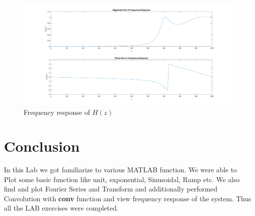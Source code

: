 \documentclass{article}
\begin{document}


\begin{figure}[H]

    \centering
    \includegraphics[scale=0.55,cframe=blue 0.5pt 3pt]{./FIG/FreqRes}
    \caption{ Frequency response of $H(z)$ }
\end{figure}



\section{Conclusion}
In this Lab we got familiarize to various MATLAB function. We were able to Plot some basic function like unit, exponential, Sinusoidal, Ramp etc. We also find and plot Fourier Series and Transform and additionally performed Convolution with \textbf{conv} function and view frequency response of the system. Thus all the LAB exercises were completed.
\end{document}
